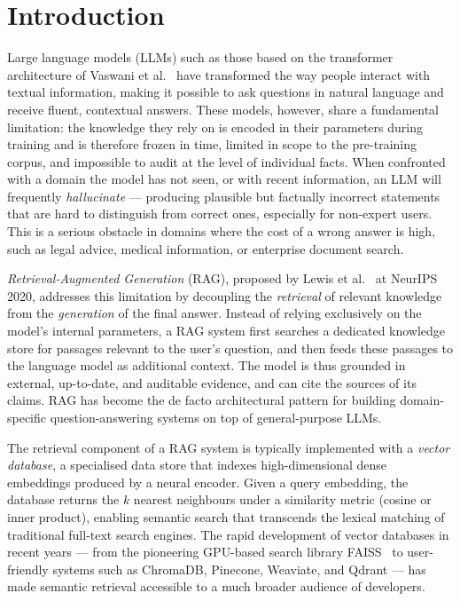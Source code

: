 \chapter{Introduction}
\label{chap:introduction}

Large language models (LLMs) such as those based on the transformer
architecture of Vaswani et al.~\cite{Vaswani2017Attention} have transformed the
way people interact with textual information, making it possible to ask
questions in natural language and receive fluent, contextual answers. These
models, however, share a fundamental limitation: the knowledge they rely on is
encoded in their parameters during training and is therefore frozen in time,
limited in scope to the pre-training corpus, and impossible to audit at the
level of individual facts. When confronted with a domain the model has not
seen, or with recent information, an LLM will frequently \emph{hallucinate} ---
producing plausible but factually incorrect statements that are hard to
distinguish from correct ones, especially for non-expert users. This is a
serious obstacle in domains where the cost of a wrong answer is high, such as
legal advice, medical information, or enterprise document search.

\emph{Retrieval-Augmented Generation} (RAG), proposed by Lewis et
al.~\cite{Lewis2020RAG} at NeurIPS 2020, addresses this limitation by
decoupling the \emph{retrieval} of relevant knowledge from the \emph{generation}
of the final answer. Instead of relying exclusively on the model's internal
parameters, a RAG system first searches a dedicated knowledge store for
passages relevant to the user's question, and then feeds these passages to the
language model as additional context. The model is thus grounded in external,
up-to-date, and auditable evidence, and can cite the sources of its claims.
RAG has become the de facto architectural pattern for building domain-specific
question-answering systems on top of general-purpose LLMs.

The retrieval component of a RAG system is typically implemented with a
\emph{vector database}, a specialised data store that indexes high-dimensional
dense embeddings produced by a neural encoder. Given a query embedding, the
database returns the $k$ nearest neighbours under a similarity metric (cosine
or inner product), enabling semantic search that transcends the lexical
matching of traditional full-text search engines. The rapid development of
vector databases in recent years --- from the pioneering GPU-based search
library FAISS~\cite{Johnson2021FAISS} to user-friendly systems such as
ChromaDB, Pinecone, Weaviate, and Qdrant --- has made semantic retrieval
accessible to a much broader audience of developers.

